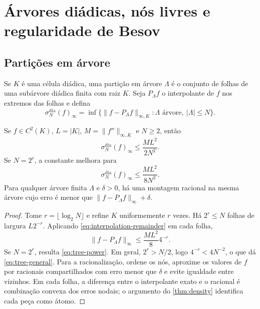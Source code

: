 \section{Árvores diádicas, nós livres e regularidade de Besov}
\label{sec:dyadic-trees}

\subsection{Partições em árvore}

Se $K$ é uma célula diádica, uma partição em árvore $\Lambda$ é o conjunto de folhas de uma subárvore diádica finita com raiz $K$. Seja $P_\Lambda f$ o interpolante de $f$ nos extremos das folhas e defina
\begin{equation}
 \sigma_N^{\mathrm{dia}}(f)_\infty
 =\inf\{\|f-P_\Lambda f\|_{\infty,K}:\Lambda\text{ árvore},\ |\Lambda|\le N\}.
 \label{eq:sigma-dyadic}
\end{equation}

\begin{theorem}\label{thm:tree-rate}
Se $f\in C^2(K)$, $L=|K|$, $M=\|f''\|_{\infty,K}$ e $N\ge2$, então
\begin{equation}
 \sigma_N^{\mathrm{dia}}(f)_\infty\le\frac{ML^2}{2N^2}.
 \label{eq:tree-general}
\end{equation}
Se $N=2^r$, a constante melhora para
\begin{equation}
 \sigma_N^{\mathrm{dia}}(f)_\infty\le\frac{ML^2}{8N^2}.
 \label{eq:tree-power}
\end{equation}
Para qualquer árvore finita $\Lambda$ e $\delta>0$, há uma montagem racional na mesma árvore cujo erro é menor que $\|f-P_\Lambda f\|_\infty+\delta$.
\end{theorem}

\begin{proof}
Tome $r=\lfloor\log_2N\rfloor$ e refine $K$ uniformemente $r$ vezes. Há $2^r\le N$ folhas de largura $L2^{-r}$. Aplicando \eqref{eq:interpolation-remainder} em cada folha,
\[
 \|f-P_\Lambda f\|_\infty\le\frac{ML^2}{8}4^{-r}.
\]
Se $N=2^r$, resulta \eqref{eq:tree-power}. Em geral, $2^r>N/2$, logo $4^{-r}<4N^{-2}$, o que dá \eqref{eq:tree-general}. Para a racionalização, ordene os nós, aproxime os valores de $f$ por racionais compartilhados com erro menor que $\delta$ e evite igualdade entre vizinhos. Em cada folha, a diferença entre o interpolante exato e o racional é combinação convexa dos erros nodais; o argumento do \cref{thm:density} identifica cada peça como átomo.
\end{proof}

